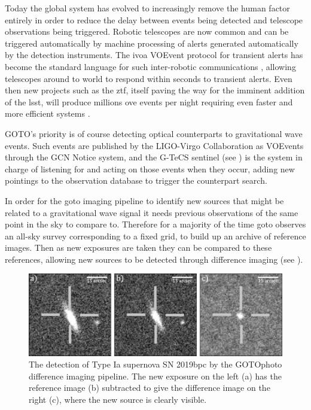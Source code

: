 \begin{colsection}
\begin{colsection}
Today the global system has evolved to increasingly remove the human factor entirely in order to reduce the delay between events being detected and telescope observations being triggered. Robotic telescopes are now common and can be triggered automatically by machine processing of alerts generated automatically by the detection instruments. The \gls{ivoa} VOEvent protocol for transient alerts has become the standard language for such inter-robotic communications \citep{voevent}, allowing telescopes around to world to respond within seconds to transient alerts. Even then new projects such as the \gls{ztf}, itself paving the way for the imminent addition of the \gls{lsst}, will produce millions ove events per night requiring even faster and more efficient systems \citep{ZTF_alerts}.

GOTO's priority is of course detecting optical counterparts to gravitational wave events. Such events are published by the LIGO-Virgo Collaboration as VOEvents through the GCN Notice system, and the G-TeCS sentinel (see ) is the system in charge of listening for and acting on those events when they occur, adding new pointings to the observation database to trigger the counterpart search.

In order for the \gls{goto} imaging pipeline to identify new sources that might be related to a gravitational wave signal it needs previous observations of the same point in the sky to compare to. Therefore for a majority of the time \gls{goto} observes an all-sky survey corresponding to a fixed grid, to build up an archive of reference images. Then as new exposures are taken they can be compared to these references, allowing new sources to be detected through difference imaging (see ).

\begin{figure}[t]
    \begin{center}
        \includegraphics[width=\linewidth]{images/diffimg.pdf}
    \end{center}
    \caption[The detection of SN 2019bpc through difference imaging]{
        The detection of Type Ia supernova SN 2019bpc by the GOTOphoto difference imaging pipeline. The new exposure on the left (a) has the reference image (b) subtracted to give the difference image on the right (c), where the new source is clearly visible.
    }\label{fig:difference_imaging}
\end{figure}

\end{colsection}


\end{colsection}

